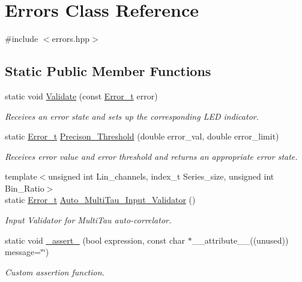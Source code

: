 \hypertarget{classErrors}{}\section{Errors Class Reference}
\label{classErrors}


{\ttfamily \#include $<$errors.\+hpp$>$}

\subsection*{Static Public Member Functions}
\begin{DoxyCompactItemize}
\item 
static void \hyperlink{classErrors_a9e43e14a2d0834f192b954cce71c387b}{Validate} (const \hyperlink{errors_8hpp_a4e8c0d09726859e3d3369c0da5a1aa7f}{Error\+\_\+t} error)
\begin{DoxyCompactList}\small\item\em Receives an error state and sets up the corresponding L\+ED indicator. \end{DoxyCompactList}\item 
static \hyperlink{errors_8hpp_a4e8c0d09726859e3d3369c0da5a1aa7f}{Error\+\_\+t} \hyperlink{classErrors_a1568635c69e70e2422a5a632d8d6809d}{Precison\+\_\+\+Threshold} (double error\+\_\+val, double error\+\_\+limit)
\begin{DoxyCompactList}\small\item\em Receives error value and error threshold and returns an appropriate error state. \end{DoxyCompactList}\item 
{\footnotesize template$<$unsigned int Lin\+\_\+channels, index\+\_\+t Series\+\_\+size, unsigned int Bin\+\_\+\+Ratio$>$ }\\static \hyperlink{errors_8hpp_a4e8c0d09726859e3d3369c0da5a1aa7f}{Error\+\_\+t} \hyperlink{classErrors_a8578169dc7b56d2080f07a0647f627e1}{Auto\+\_\+\+Multi\+Tau\+\_\+\+Input\+\_\+\+Validator} ()
\begin{DoxyCompactList}\small\item\em Input Validator for Multi\+Tau auto-\/correlator. \end{DoxyCompactList}\item 
static void \hyperlink{classErrors_a3618ed0e7aba69be0759fa821a987b3b}{\+\_\+assert\+\_\+} (bool expression, const char $\ast$\+\_\+\+\_\+attribute\+\_\+\+\_\+((unused)) message=\char`\"{}\char`\"{})
\begin{DoxyCompactList}\small\item\em Custom assertion function. \end{DoxyCompactList}\end{DoxyCompactItemize}


